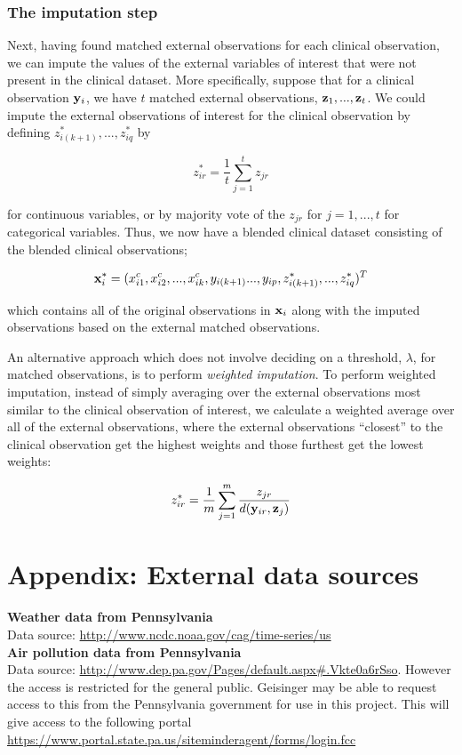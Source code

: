 \documentclass{article}
\begin{document}
\subsubsection*{The imputation step}


Next, having found matched external observations for each clinical observation, we can impute the values of the external variables of interest that were not present in the clinical dataset. More specifically, suppose that for a clinical observation ${\bf y}_i$, we have $t$ matched external observations, ${\bf z}_1, ..., {\bf z}_t$. We could impute the external observations of interest for the clinical observation by  defining $z^*_{i(k+1)}, ..., z^*_{iq}$ by

$$z^*_{ir} = \frac{1}{t} \sum_{j=1}^t z_{jr}$$

for continuous variables, or by majority vote of the $z_{jr}$ for $j = 1, ..., t$ for categorical variables. Thus, we now have a blended clinical dataset consisting of the blended clinical observations;

$${\bf x}^*_i = (x^c_{i1}, x^c_{i2}, ..., x^c_{ik}, y_{i(k+1)} ..., y_{ip}, z_{i(k+1)}^*, ..., z_{iq}^*)^T$$

which contains all of the original observations in ${\bf x}_i$ along with the imputed observations based on the external matched observations.

An alternative approach which does not involve deciding on a threshold, $\lambda$, for matched observations, is to perform \emph{weighted imputation}. To perform weighted imputation, instead of simply averaging over the external observations most similar to the clinical observation of interest, we calculate a weighted average over all of the external observations, where the external observations ``closest'' to the clinical observation get the highest weights and those furthest get the lowest weights:

$$z^*_{ir} = \frac{1}{m} \sum_{j=1}^m \frac{z_{jr}}{d({\bf y}_{ir}, {\bf z}_{j})}$$


\section*{Appendix: External data sources}


{\bf Weather data from Pennsylvania}\\
Data source: \url{http://www.ncdc.noaa.gov/cag/time-series/us}\\

{\bf Air pollution data from Pennsylvania}\\
Data source: \url{http://www.dep.pa.gov/Pages/default.aspx#.Vkte0a6rSso}. However the access is restricted for the general public. Geisinger may be able to request access to this from the Pennsylvania government for use in this project. This will give access to the following portal
\url{https://www.portal.state.pa.us/siteminderagent/forms/login.fcc}
\end{document}
